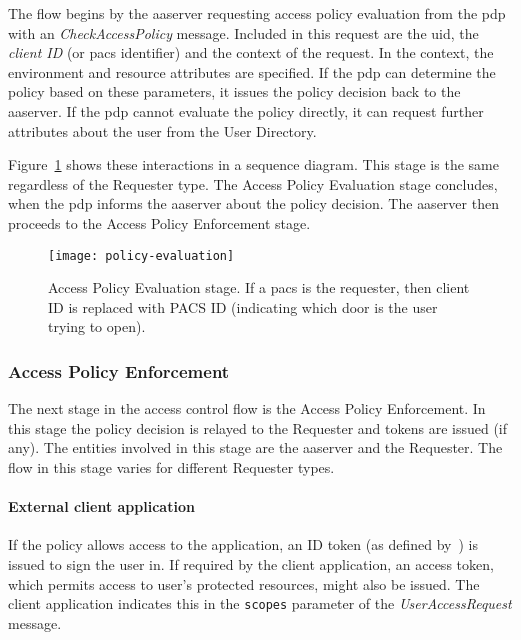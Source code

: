 The flow begins by the \acrshort{aaserver} requesting access policy evaluation from the \acrshort{pdp} with an \textit{CheckAccessPolicy} message. Included in this request are the \acrshort{uid}, the \textit{client ID} (or \acrshort{pacs} identifier) and the context of the request. In the context, the environment and resource attributes are specified. If the \acrshort{pdp} can determine the policy based on these parameters, it issues the policy decision back to the \acrshort{aaserver}. If the \acrshort{pdp} cannot evaluate the policy directly, it can request further attributes about the user from the User Directory.

Figure~\ref{fig:policy-evaluation} shows these interactions in a sequence diagram. This stage is the same regardless of the Requester type. The Access Policy Evaluation stage concludes, when the \acrshort{pdp} informs the \acrshort{aaserver} about the policy decision. The \acrshort{aaserver} then proceeds to the Access Policy Enforcement stage.

\begin{figure}[H]
    \centering
    \texttt{[image: policy-evaluation]}
    \caption{Access Policy Evaluation stage. If a \acrshort{pacs} is the requester, then client ID is replaced with PACS ID (indicating which door is the user trying to open).}
    \label{fig:policy-evaluation}
\end{figure}

\subsubsection{Access Policy Enforcement}
The next stage in the access control flow is the Access Policy Enforcement. In this stage the policy decision is relayed to the Requester and tokens are issued (if any). The entities involved in this stage are the \acrshort{aaserver} and the Requester. The flow in this stage varies for different Requester types.

\paragraph{External client application}
If the policy allows access to the application, an ID token (as defined by~\cite{OpenID2014OpenID1}) is issued to sign the user in. If required by the client application, an access token, which permits access to user's protected resources, might also be issued. The client application indicates this in the \texttt{scopes} parameter of the \textit{UserAccessRequest} message.


